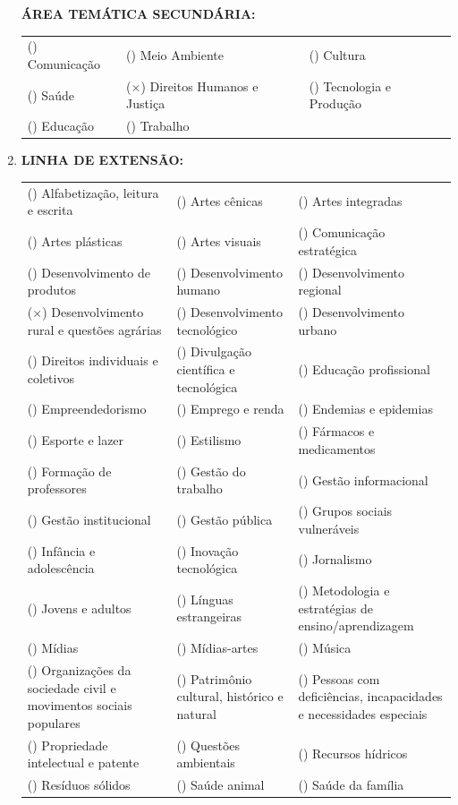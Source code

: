\documentclass[12pt,a4paper,oneside]{article}%
\begin{document}
\begin{enumerate}
\textbf{ÁREA TEMÁTICA SECUNDÁRIA: }%
\newline%
\begin{tabularx}{\linewidth}{|X|X|X|}%
\hline%
() Comunicação&() Meio Ambiente&() Cultura\\%
() Saúde&($\times$) Direitos Humanos e Justiça&() Tecnologia e Produção\\%
() Educação&() Trabalho&\\%
\hline%
\end{tabularx}%
\newpage%
\item%
\textbf{LINHA DE EXTENSÃO: }%
\newline%
\newline%
{\tiny%
\begin{tabularx}{\linewidth}{X|X|X}%
() Alfabetização, leitura e escrita&() Artes cênicas&() Artes integradas\\%
() Artes plásticas&() Artes visuais&() Comunicação estratégica\\%
() Desenvolvimento de produtos&() Desenvolvimento humano&() Desenvolvimento regional\\%
($\times$) Desenvolvimento rural e questões agrárias&() Desenvolvimento tecnológico&() Desenvolvimento urbano\\%
() Direitos individuais e coletivos&() Divulgação científica e tecnológica&() Educação profissional\\%
() Empreendedorismo&() Emprego e renda&() Endemias e epidemias\\%
() Esporte e lazer&() Estilismo&() Fármacos e medicamentos\\%
() Formação de professores&() Gestão do trabalho&() Gestão informacional\\%
() Gestão institucional&() Gestão pública&() Grupos sociais vulneráveis\\%
() Infância e adolescência&() Inovação tecnológica&() Jornalismo\\%
() Jovens e adultos&() Línguas estrangeiras&() Metodologia e estratégias de ensino/aprendizagem\\%
() Mídias&() Mídias{-}artes&() Música\\%
() Organizações da sociedade civil e movimentos sociais populares&() Patrimônio cultural, histórico e natural&() Pessoas com deficiências, incapacidades e necessidades especiais\\%
() Propriedade intelectual e patente&() Questões ambientais&() Recursos hídricos\\%
() Resíduos sólidos&() Saúde animal&() Saúde da família\\%

\end{tabularx}}
\end{enumerate}
\end{document}
